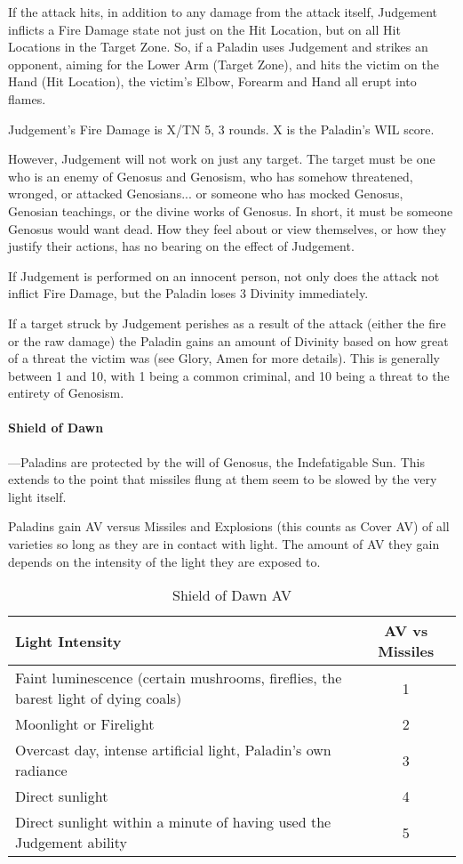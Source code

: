 \documentclass[oneside,11pt,english]{book}
\begin{document}
If the attack hits, in addition to any damage from the attack itself, Judgement inflicts a Fire Damage state not just on the Hit Location, but on all Hit Locations in the Target Zone. So, if a Paladin uses Judgement and strikes an opponent, aiming for the Lower Arm (Target Zone), and hits the victim on the Hand (Hit Location), the victim's Elbow, Forearm and Hand all erupt into flames.

Judgement's Fire Damage is X/TN 5, 3 rounds. X is the Paladin's WIL score.

However, Judgement will not work on just any target. The target must be one who is an enemy of 
Genosus and Genosism, who has somehow threatened, wronged, or attacked Genosians... or 
someone who has mocked Genosus, Genosian teachings, or the divine works of Genosus. In 
short, it must be someone Genosus would want dead. How they feel about or view themselves, or 
how they justify their actions, has no bearing on the effect of Judgement. 

If Judgement is performed on an innocent person, not only does the attack not inflict Fire Damage, but the Paladin loses 3 Divinity immediately. 

If a target struck by Judgement perishes as a result of the attack (either the fire or the raw 
damage) the Paladin gains an amount of Divinity based on how great of a threat the victim was 
(see Glory, Amen for more details). This is generally between 1 and 10, with 1 being a common 
criminal, and 10 being a threat to the entirety of Genosism. 
\paragraph{Shield of Dawn}
---\quad Paladins are protected by the will of Genosus, the Indefatigable Sun. This extends to the point 
that missiles flung at them seem to be slowed by the very light itself.

Paladins gain AV versus Missiles and Explosions (this counts as Cover AV) of all varieties so 
long as they are in contact with light. The amount of AV they gain depends on the intensity of the 
light they are exposed to.

\begin{table}[!ht]
	\caption{Shield of Dawn AV}
	\label{tab:Shield of Dawn AV}
	\begin{tabu} spread 0pt {Xc}
		Light Intensity& AV vs Missiles\\\toprule
		Faint luminescence (certain mushrooms, fireflies, the barest light of dying coals)& 1\\
		Moonlight or Firelight &2\\
		Overcast day, intense artificial light, Paladin's own radiance& 3\\
		Direct sunlight& 4\\
		Direct sunlight within a minute of having used the Judgement ability& 5\\
	\end{tabu}
\end{table}
\end{document}

